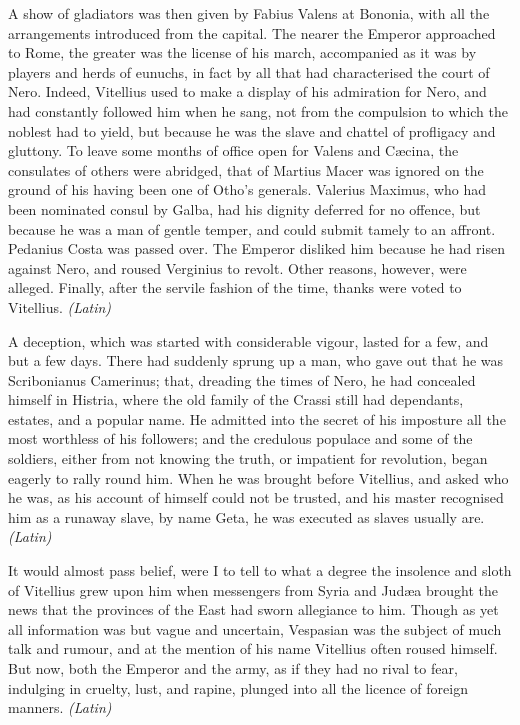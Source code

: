 
A show of gladiators was then given by Fabius Valens at Bononia, with all the arrangements introduced from the capital. The nearer the Emperor approached to Rome, the greater was the license of his march, accompanied as it was by players and herds of eunuchs, in fact by all that had characterised the court of Nero. Indeed, Vitellius used to make a display of his admiration for Nero, and had constantly followed him when he sang, not from the compulsion to which the noblest had to yield, but because he was the slave and chattel of profligacy and gluttony. To leave some months of office open for Valens and Cæcina, the consulates of others were abridged, that of Martius Macer was ignored on the ground of his having been one of Otho's generals. Valerius Maximus, who had been nominated consul by Galba, had his dignity deferred for no offence, but because he was a man of gentle temper, and could submit tamely to an affront. Pedanius Costa was passed over. The Emperor disliked him because he had risen against Nero, and roused Verginius to revolt. Other reasons, however, were alleged. Finally, after the servile fashion of the time, thanks were voted to Vitellius. \emph{(Latin)}


A deception, which was started with considerable vigour, lasted for a few, and but a few days. There had suddenly sprung up a man, who gave out that he was Scribonianus Camerinus; that, dreading the times of Nero, he had concealed himself in Histria, where the old family of the Crassi still had dependants, estates, and a popular name. He admitted into the secret of his imposture all the most worthless of his followers; and the credulous populace and some of the soldiers, either from not knowing the truth, or impatient for revolution, began eagerly to rally round him. When he was brought before Vitellius, and asked who he was, as his account of himself could not be trusted, and his master recognised him as a runaway slave, by name Geta, he was executed as slaves usually are. \emph{(Latin)}


It would almost pass belief, were I to tell to what a degree the insolence and sloth of Vitellius grew upon him when messengers from Syria and Judæa brought the news that the provinces of the East had sworn allegiance to him. Though as yet all information was but vague and uncertain, Vespasian was the subject of much talk and rumour, and at the mention of his name Vitellius often roused himself. But now, both the Emperor and the army, as if they had no rival to fear, indulging in cruelty, lust, and rapine, plunged into all the licence of foreign manners. \emph{(Latin)}

